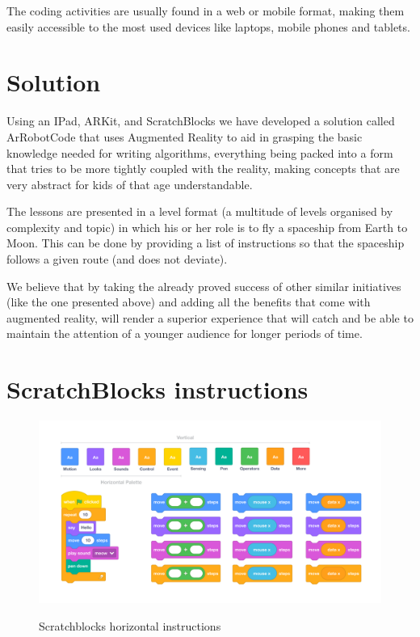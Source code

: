 \documentclass[12 pct]{report}
\begin{document}
The coding  activities are usually found in a web or mobile format, making them easily accessible to the most used devices like laptops, mobile phones and tablets.

\section{Solution}
Using an IPad, ARKit, and ScratchBlocks we have developed a solution called ArRobotCode that uses Augmented Reality to aid in grasping the basic knowledge needed for writing algorithms, everything being packed into a form that tries to be more tightly coupled with the reality, making concepts that are very abstract for kids of that age understandable.

The lessons are presented in a level format (a multitude of levels organised by complexity and topic) in which his or her role is to fly a spaceship from Earth to Moon. This can be done by providing a list of instructions so that the spaceship follows a given route (and does not deviate).

We believe that by taking the already proved success of other similar initiatives (like the one presented above) and adding all the benefits that come with augmented reality, will render a superior experience that will catch and be able to maintain the attention of a younger audience for longer periods of time.

\section{ScratchBlocks instructions}
\begin{figure}[H]
\includegraphics[width=1.0\textwidth]{scratchblocks-2}
\centering
\label{fig:hololens}
\caption{Scratchblocks horizontal instructions}
\end{figure}
\end{document}
